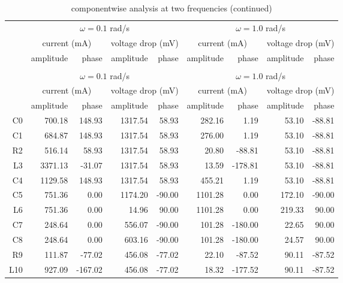 \begin{longtable}{rrrrrrrrr}
\caption{componentwise analysis at two frequencies}\\
\toprule
&
\multicolumn{4}{c}{$\omega = 0.1$ rad/s}&
\multicolumn{4}{c}{$\omega = 1.0$ rad/s}\\
\cmidrule(lr){2-5}
\cmidrule(l){6-9}&
\multicolumn{2}{c}{current (mA)}&
\multicolumn{2}{c}{voltage drop (mV)}&
\multicolumn{2}{c}{current (mA)}&
\multicolumn{2}{c}{voltage drop (mV)}\\
\cmidrule(lr){2-3}
\cmidrule(lr){4-5}
\cmidrule(lr){6-7}
\cmidrule(l){8-9}
&
amplitude&
phase&
amplitude&
phase&
amplitude&
phase&
amplitude&
phase\\
\midrule
\endfirsthead
\caption{componentwise analysis at two frequencies (continued)}\\
\toprule
&
\multicolumn{4}{c}{$\omega = 0.1$ rad/s}&
\multicolumn{4}{c}{$\omega = 1.0$ rad/s}\\
\cmidrule(lr){2-5}
\cmidrule(l){6-9}&
\multicolumn{2}{c}{current (mA)}&
\multicolumn{2}{c}{voltage drop (mV)}&
\multicolumn{2}{c}{current (mA)}&
\multicolumn{2}{c}{voltage drop (mV)}\\
\cmidrule(lr){2-3}
\cmidrule(lr){4-5}
\cmidrule(lr){6-7}
\cmidrule(l){8-9}
&
amplitude&
phase&
amplitude&
phase&
amplitude&
phase&
amplitude&
phase\\
\midrule
\endhead
\bottomrule
\endfoot
\label{can}
C0 & 700.18 & 148.93 & 1317.54 & 58.93 & 282.16 & 1.19 & 53.10 & -88.81\\
C1 & 684.87 & 148.93 & 1317.54 & 58.93 & 276.00 & 1.19 & 53.10 & -88.81\\
R2 & 516.14 & 58.93 & 1317.54 & 58.93 & 20.80 & -88.81 & 53.10 & -88.81\\
L3 & 3371.13 & -31.07 & 1317.54 & 58.93 & 13.59 & -178.81 & 53.10 & -88.81\\
C4 & 1129.58 & 148.93 & 1317.54 & 58.93 & 455.21 & 1.19 & 53.10 & -88.81\\
C5 & 751.36 & 0.00 & 1174.20 & -90.00 & 1101.28 & 0.00 & 172.10 & -90.00\\
L6 & 751.36 & 0.00 & 14.96 & 90.00 & 1101.28 & 0.00 & 219.33 & 90.00\\
C7 & 248.64 & 0.00 & 556.07 & -90.00 & 101.28 & -180.00 & 22.65 & 90.00\\
C8 & 248.64 & 0.00 & 603.16 & -90.00 & 101.28 & -180.00 & 24.57 & 90.00\\
R9 & 111.87 & -77.02 & 456.08 & -77.02 & 22.10 & -87.52 & 90.11 & -87.52\\
L10 & 927.09 & -167.02 & 456.08 & -77.02 & 18.32 & -177.52 & 90.11 & -87.52\\

\end{longtable}
